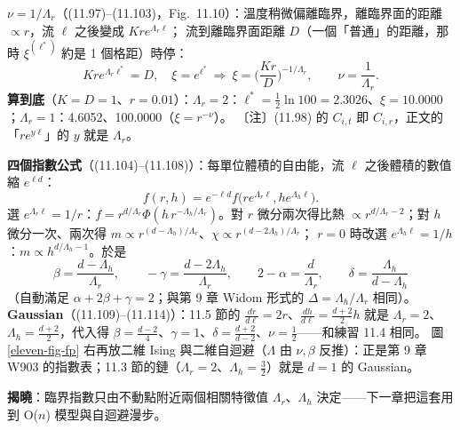 \textbf{$\nu=1/\Lambda_r$}（(11.97)--(11.103)，Fig.~11.10）：溫度稍微偏離臨界，離臨界面的距離 $\propto r$，流 $\ell$ 之後變成 $Kre^{\Lambda_r\ell}$；
流到離臨界面距離 $D$（一個「普通」的距離，那時 $\xi^{(\ell^*)}$ 約是 1 個格距）時停：
\[Kre^{\Lambda_r\ell^*}=D,\quad\xi=e^{\ell^*}\ \Rightarrow\ \xi=\Big(\frac{Kr}D\Big)^{-1/\Lambda_r},\qquad\nu=\frac1{\Lambda_r}.\tag{11.99--11.103}\]
\textbf{算到底}（$K=D=1$、$r=0.01$）：$\Lambda_r=2$：$\ell^*=\frac12\ln100=2.3026$、$\xi=10.0000$；$\Lambda_r=1$：4.6052、100.0000（$\xi=r^{-\nu}$）。
〔注〕(11.98) 的 $C_{i,t}$ 即 $C_{i,r}$，正文的「$re^{y\ell}$」的 $y$ 就是 $\Lambda_r$。

\textbf{四個指數公式}（(11.104)--(11.108)）：每單位體積的自由能，流 $\ell$ 之後體積的數值縮 $e^{\ell d}$：
\[f(r,h)=e^{-\ell d}f\big(re^{\Lambda_r\ell},he^{\Lambda_h\ell}\big).\tag{11.104}\]
選 $e^{\Lambda_r\ell}=1/r$：$f=r^{d/\Lambda_r}\Phi(h\,r^{-\Lambda_h/\Lambda_r})$。對 $r$ 微分兩次得比熱 $\propto r^{d/\Lambda_r-2}$；對 $h$ 微分一次、兩次得 $m\propto r^{(d-\Lambda_h)/\Lambda_r}$、$\chi\propto r^{(d-2\Lambda_h)/\Lambda_r}$；
$r=0$ 時改選 $e^{\Lambda_h\ell}=1/h$：$m\propto h^{d/\Lambda_h-1}$。於是
\[\beta=\frac{d-\Lambda_h}{\Lambda_r},\qquad-\gamma=\frac{d-2\Lambda_h}{\Lambda_r},\qquad2-\alpha=\frac d{\Lambda_r},\qquad\delta=\frac{\Lambda_h}{d-\Lambda_h}\tag{11.105--11.108}\]
（自動滿足 $\alpha+2\beta+\gamma=2$；與第 9 章 Widom 形式的 $\Delta=\Lambda_h/\Lambda_r$ 相同）。
\textbf{Gaussian}（(11.109)--(11.114)）：11.5 節的 $\frac{dr}{d\ell}=2r$、$\frac{dh}{d\ell}=\frac{d+2}2h$ 就是 $\Lambda_r=2$、$\Lambda_h=\frac{d+2}2$，代入得 $\beta=\frac{d-2}4$、$\gamma=1$、$\delta=\frac{d+2}{d-2}$、$\nu=\frac12$——和練習 11.4 相同。
圖 \ref{eleven-fig-fp} 右再放二維 Ising 與二維自迴避（$\Lambda$ 由 $\nu,\beta$ 反推）：正是第 9 章 W903 的指數表；11.3 節的鏈（$\Lambda_r=2$、$\Lambda_h=\frac32$）就是 $d=1$ 的 Gaussian。

\textbf{揭曉}：臨界指數只由不動點附近兩個相關特徵值 $\Lambda_r$、$\Lambda_h$ 決定——下一章把這套用到 O($n$) 模型與自迴避漫步。

